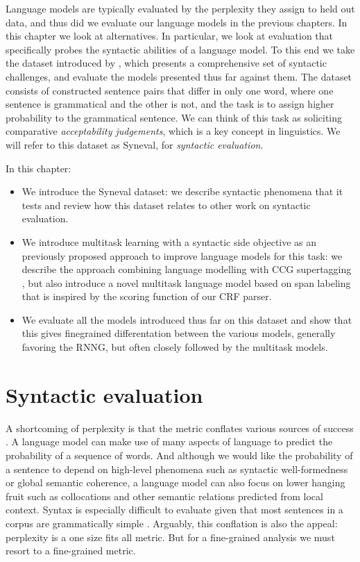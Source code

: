 % 

Language models are typically evaluated by the perplexity they assign to held out data, and thus did we evaluate our language models in the previous chapters. In this chapter we look at alternatives. In particular, we look at evaluation that specifically probes the syntactic abilities of a language model. To this end we take the dataset introduced by \citet{linzen2018targeted}, which presents a comprehensive set of syntactic challenges, and evaluate the models presented thus far against them. The dataset consists of constructed sentence pairs that differ in only one word, where one sentence is grammatical and the other is not, and the task is to assign higher probability to the grammatical sentence. We can think of this task as soliciting comparative \textit{acceptability judgements}, which is a key concept in linguistics. We will refer to this dataset as Syneval, for \textit{syntactic evaluation}.

In this chapter:
\begin{itemize}
  \item We introduce the Syneval dataset: we describe syntactic phenomena that it tests and review how this dataset relates to other work on syntactic evaluation.
  \item We introduce multitask learning with a syntactic side objective as an previously proposed approach to improve language models for this task: we describe the approach combining language modelling with CCG supertagging \citep{enguehard2017multitask}, but also introduce a novel multitask language model based on span labeling that is inspired by the scoring function of our CRF parser.
  \item We evaluate all the models introduced thus far on this dataset and show that this gives finegrained differentation between the various models, generally favoring the RNNG, but often closely followed by the multitask models.
\end{itemize}

\section{Syntactic evaluation}
A shortcoming of perplexity is that the metric conflates various sources of success \citep{linzen2018targeted}. A language model can make use of many aspects of language to predict the probability of a sequence of words. And although we would like the probability of a sentence to depend on high-level phenomena such as syntactic well-formedness or global semantic coherence, a language model can also focus on lower hanging fruit such as collocations and other semantic relations predicted from local context. Syntax is especially difficult to evaluate given that most sentences in a corpus are grammatically simple \citep{linzen2018targeted}. Arguably, this conflation is also the appeal: perplexity is a one size fits all metric. But for a fine-grained analysis we must resort to a fine-grained metric.

